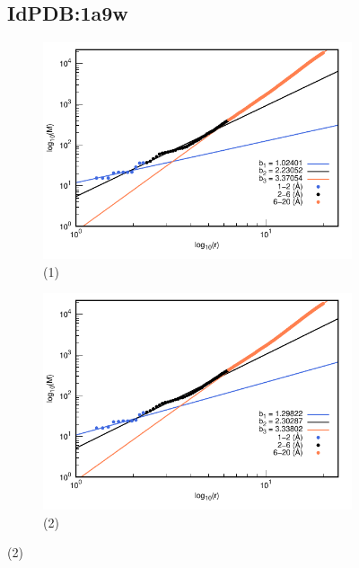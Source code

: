 		
		\begin{figure}[H]
			\subsection*{IdPDB:1a9w}
			
			\hspace{-0.3cm} 
			\begin{subfigure}{0.49\textwidth}
				\centering
				\includegraphics[width=\linewidth,page=1]{graphs/PDBs/1a9w/1a9waddH.pdf}
				\caption{(1)}
			\end{subfigure}
			\hspace{0.2cm}
			\begin{subfigure}{0.49\textwidth}
				\centering
				\includegraphics[width=\linewidth,page=1]{graphs/PDBs/1a9w/1a9wEm.pdf}
				\caption{(2)}
			\end{subfigure}
			

\end{figure}
